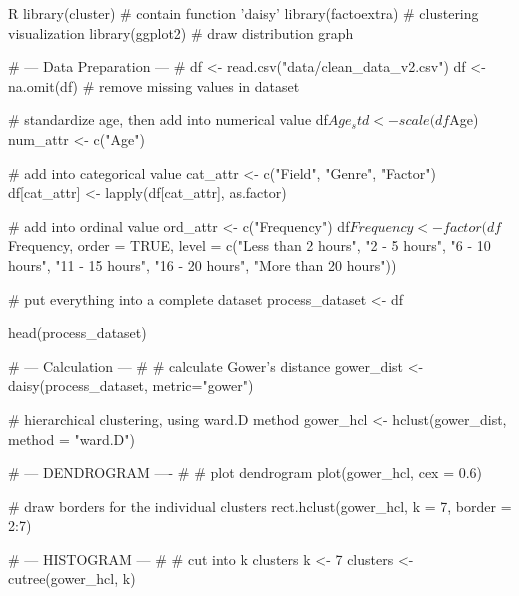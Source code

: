         \begin{code}{R}
            library(cluster)      # contain function 'daisy'
            library(factoextra)   # clustering visualization
            library(ggplot2)      # draw distribution graph
            
                      # --- Data Preparation --- #
            df <- read.csv("data/clean_data_v2.csv")
            df <- na.omit(df)     # remove missing values in dataset
            
            # standardize age, then add into numerical value
            df$Age_std <- scale(df$Age)
            num_attr <- c("Age")
            
            # add into categorical value
            cat_attr <- c("Field", "Genre", "Factor")
            df[cat_attr] <- lapply(df[cat_attr], as.factor)
            
            # add into ordinal value
            ord_attr <- c("Frequency")
            df$Frequency <- factor(df$Frequency, 
                                   order = TRUE, 
                                   level = c("Less than 2 hours", 
                                             "2 - 5 hours", 
                                             "6 - 10 hours", 
                                             "11 - 15 hours", 
                                             "16 - 20 hours", 
                                             "More than 20 hours"))
            
            # put everything into a complete dataset
            process_dataset <- df %
            
            head(process_dataset)
            
                      # --- Calculation --- #
            # calculate Gower's distance
            gower_dist <- daisy(process_dataset, metric="gower")   
            
            # hierarchical clustering, using ward.D method 
            gower_hcl <- hclust(gower_dist, method = "ward.D")  
            
                      # --- DENDROGRAM ---- #
            # plot dendrogram
            plot(gower_hcl, cex = 0.6)
            
            # draw borders for the individual clusters
            rect.hclust(gower_hcl, k = 7, border = 2:7)
            
                      # --- HISTOGRAM --- #
            # cut into k clusters
            k <- 7
            clusters <- cutree(gower_hcl, k)
            

\end{code}
